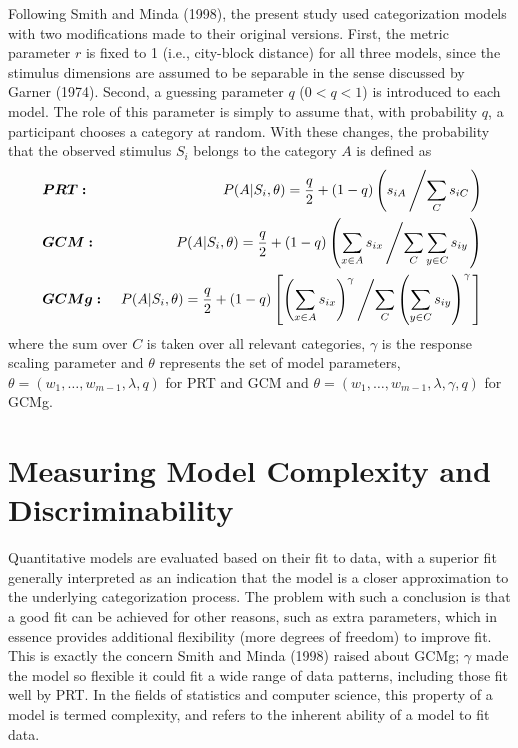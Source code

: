 \documentclass[11pt]{article}
\begin{document}
Following Smith and Minda (1998), the present study used categorization models with two
modifications made to their original versions. First, the metric parameter $r$ is fixed to 1
(i.e., city-block distance) for all three models, since the stimulus dimensions are assumed to be
separable in the sense discussed by Garner (1974). Second, a guessing parameter $q$ ($0 < q < 1$)
is introduced to each model. The role of this parameter is simply to assume that, with probability
$q$, a participant chooses a category at random. With these changes, the probability that the
observed stimulus $S_i$ belongs to the category $A$ is defined as
\begin{eqnarray}\label{models}
&~\bm{PRT:}~~~~&P(A|S_{i},\theta) = \frac{q}{2} + (1-q)  \left(s_{iA} \left/ \sum_{C} s_{iC}
\right. \right) \nonumber \\
&~\bm{GCM:}~~~&P(A|S_{i},\theta) = \frac{q}{2} + (1-q)  \left(\sum_{x \in A} s_{ix} \left/
\sum_{C}
\sum_{y\in C} s_{iy} \right. \right) \\
&~\bm{GCMg:}~& P(A|S_{i},\theta) = \frac{q}{2} + (1-q)  \left[\left(\sum_{x \in A}
s_{ix}\right)^{\gamma} \left/ \sum_{C} \left(\sum_{y \in C} s_{iy} \right)^{\gamma} \right.
\right] \nonumber
\end{eqnarray}
where the sum over $C$ is taken over all relevant categories, $\gamma$ is the response scaling
parameter and $\theta$ represents the set of model parameters, $\theta=(w_1, \ldots, w_{m-1},
\lambda, q)$ for PRT and GCM and $\theta=(w_1, \ldots, w_{m-1}, \lambda, \gamma, q)$ for GCMg.


\section{Measuring Model Complexity and Discriminability}
Quantitative models are evaluated based on their fit to data, with a superior fit generally
interpreted as an indication that the model is a closer approximation to the underlying
categorization process. The problem with such a conclusion is that a good fit can be achieved for
other reasons, such as extra parameters, which in essence provides additional flexibility (more
degrees of freedom) to improve fit. This is exactly the concern Smith and Minda (1998) raised
about GCMg; $\gamma$ made the model so flexible it could fit a wide range of data patterns,
including those fit well by PRT. In the fields of statistics and computer science, this property
of a model is termed complexity, and refers to the inherent ability of a model to fit data.
\end{document}
